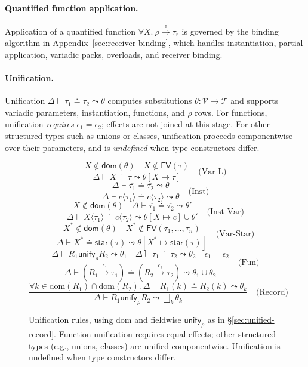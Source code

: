 \paragraph{Quantified function application.}
Application of a quantified function $\forall\overline{X}.~\rho \xrightarrow{\epsilon} \tau_r$
is governed by the binding algorithm in Appendix~\ref{sec:receiver-binding},
which handles instantiation, partial application, variadic packs, overloads, and receiver binding.
\paragraph{Unification.}  
Unification $\Delta \vdash \tau_1 \doteq \tau_2 \leadsto \theta$ computes substitutions $\theta : \mathcal{V} \to \mathcal{T}$ and supports variadic parameters, instantiation, functions, and $\rho$ rows.  
For functions, unification \emph{requires} $\epsilon_1 = \epsilon_2$; effects are not joined at this stage.  
For other structured types such as unions or classes, unification proceeds componentwise over their parameters, and is \emph{undefined} when type constructors differ.

\begin{figure*}[t]
\centering
\[
\frac{X \notin \mathsf{dom}(\theta) \quad X \notin \mathsf{FV}(\tau)}
     {\Delta \vdash X \doteq \tau \leadsto \theta[X \mapsto \tau]} \quad \text{(Var-L)}
\]
\[
\frac{\Delta \vdash \overline{\tau_1} \doteq \overline{\tau_2} \leadsto \theta}
     {\Delta \vdash c\langle\overline{\tau_1}\rangle \doteq c\langle\overline{\tau_2}\rangle \leadsto \theta} \quad \text{(Inst)}
\]
\[
\frac{X \notin \mathsf{dom}(\theta) \quad \Delta \vdash \overline{\tau_1} \doteq \overline{\tau_2} \leadsto \theta'}
     {\Delta \vdash X\langle\overline{\tau_1}\rangle \doteq c\langle\overline{\tau_2}\rangle \leadsto \theta[X \mapsto c] \cup \theta'} \quad \text{(Inst-Var)}
\]
\[
\frac{X^* \notin \mathsf{dom}(\theta) \quad X^* \notin \mathsf{FV}(\tau_1, \ldots, \tau_n)}
     {\Delta \vdash X^* \doteq \mathsf{star}(\overline{\tau}) \leadsto \theta[X^* \mapsto \mathsf{star}(\overline{\tau})]} \quad \text{(Var-Star)}
\]
\[
\frac{\Delta \vdash R_1 \mathrel{\mathsf{unify}_{\rho}} R_2 \leadsto \theta_1 \quad \Delta \vdash \tau_1 \doteq \tau_2 \leadsto \theta_2 \quad \epsilon_1 = \epsilon_2}
     {\Delta \vdash (R_1 \xrightarrow{\epsilon_1} \tau_1) \doteq (R_2 \xrightarrow{\epsilon_2} \tau_2) \leadsto \theta_1 \cup \theta_2} \quad \text{(Fun)}
\]
\[
\frac{\forall k \in \mathrm{dom}(R_1) \cap \mathrm{dom}(R_2).\ \Delta \vdash R_1(k) \doteq R_2(k) \leadsto \theta_k}
     {\Delta \vdash R_1 \mathrel{\mathsf{unify}_{\rho}} R_2 \leadsto \bigsqcup_k \theta_k} \quad \text{(Record)}
\]
\caption{Unification rules, using $\mathrm{dom}$ and fieldwise $\mathsf{unify}_{\rho}$ as in \S\ref{sec:unified-record}. Function unification requires equal effects; other structured types (e.g., unions, classes) are unified componentwise. Unification is undefined when type constructors differ.}
\label{fig:unification}
\end{figure*}

